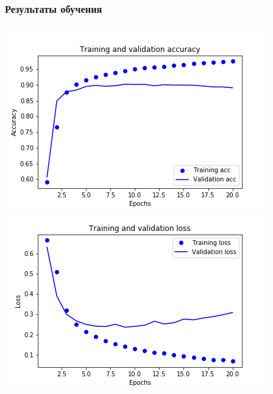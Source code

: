 \documentclass[xetex,mathserif,serif]{beamer}
\begin{document}
	\begin{frame}
		\frametitle{Результаты обучения}
	    	\begin{columns}[t]
                    \includegraphics[scale=0.37]{images/acc.png}
                    \includegraphics[scale=0.37]{images/loss.png}
            \end{columns}
	\end{frame}		
	
\end{document}
